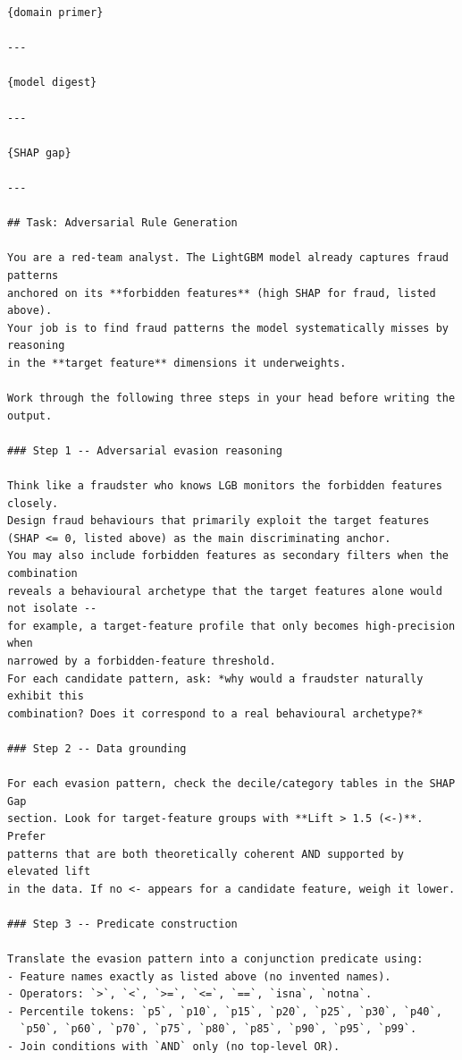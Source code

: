 \documentclass[11pt]{article}
\begin{document}
\begin{lstlisting}[basicstyle=\ttfamily\scriptsize,breaklines=true,columns=fullflexible,keepspaces=true,numbers=none,frame=single,captionpos=b,caption={Rule-proposal prompt template used for every shot (anonymized placeholders, ASCII).},label={lst:prompt}]
{domain primer}

---

{model digest}

---

{SHAP gap}

---

## Task: Adversarial Rule Generation

You are a red-team analyst. The LightGBM model already captures fraud patterns
anchored on its **forbidden features** (high SHAP for fraud, listed above).
Your job is to find fraud patterns the model systematically misses by reasoning
in the **target feature** dimensions it underweights.

Work through the following three steps in your head before writing the output.

### Step 1 -- Adversarial evasion reasoning

Think like a fraudster who knows LGB monitors the forbidden features closely.
Design fraud behaviours that primarily exploit the target features
(SHAP <= 0, listed above) as the main discriminating anchor.
You may also include forbidden features as secondary filters when the combination
reveals a behavioural archetype that the target features alone would not isolate --
for example, a target-feature profile that only becomes high-precision when
narrowed by a forbidden-feature threshold.
For each candidate pattern, ask: *why would a fraudster naturally exhibit this
combination? Does it correspond to a real behavioural archetype?*

### Step 2 -- Data grounding

For each evasion pattern, check the decile/category tables in the SHAP Gap
section. Look for target-feature groups with **Lift > 1.5 (<-)**. Prefer
patterns that are both theoretically coherent AND supported by elevated lift
in the data. If no <- appears for a candidate feature, weigh it lower.

### Step 3 -- Predicate construction

Translate the evasion pattern into a conjunction predicate using:
- Feature names exactly as listed above (no invented names).
- Operators: `>`, `<`, `>=`, `<=`, `==`, `isna`, `notna`.
- Percentile tokens: `p5`, `p10`, `p15`, `p20`, `p25`, `p30`, `p40`,
  `p50`, `p60`, `p70`, `p75`, `p80`, `p85`, `p90`, `p95`, `p99`.
- Join conditions with `AND` only (no top-level OR).


\end{lstlisting}
\end{document}
